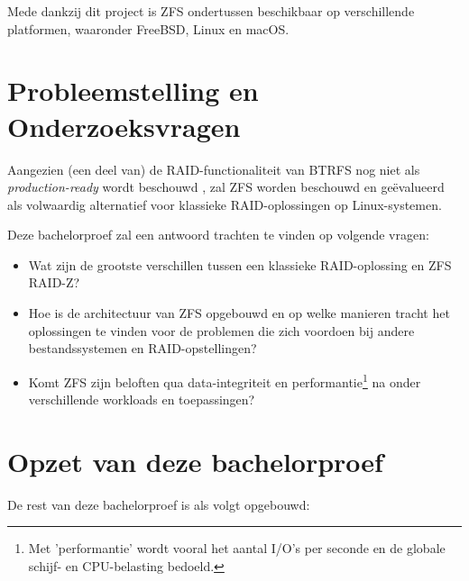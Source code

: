 Mede dankzij dit project is ZFS ondertussen beschikbaar op verschillende platformen, waaronder FreeBSD, Linux en macOS.

\section{Probleemstelling en Onderzoeksvragen}
\label{sec:onderzoeksvragen}


Aangezien (een deel van) de RAID-functionaliteit van BTRFS nog niet als \textit{production-ready} wordt beschouwd \autocite{Project2017}, zal ZFS worden beschouwd en geëvalueerd als volwaardig alternatief voor klassieke RAID-oplossingen op Linux-systemen. 

Deze bachelorproef zal een antwoord trachten te vinden op volgende vragen:

\begin{itemize}
	\item{Wat zijn de grootste verschillen tussen een klassieke RAID-oplossing en ZFS RAID-Z?}
	\item{Hoe is de architectuur van ZFS opgebouwd en op welke manieren tracht het oplossingen te vinden voor de problemen die zich voordoen bij andere bestandssystemen en RAID-opstellingen?}
	\item{Komt ZFS zijn beloften qua data-integriteit en performantie\footnote{Met 'performantie' wordt vooral het aantal I/O's per seconde en de globale schijf- en CPU-belasting bedoeld.} na onder verschillende workloads en toepassingen?}
\end{itemize}

\section{Opzet van deze bachelorproef}
\label{sec:opzet-bachelorproef}


De rest van deze bachelorproef is als volgt opgebouwd:

